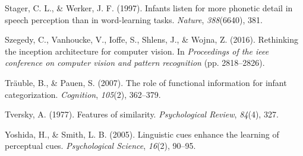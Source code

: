 \documentclass[10pt, letterpaper]{article}
\begin{document}
\hypertarget{ref-stager1997infants}{}
Stager, C. L., \& Werker, J. F. (1997). Infants listen for more phonetic
detail in speech perception than in word-learning tasks. \emph{Nature},
\emph{388}(6640), 381.

\hypertarget{ref-szegedy2016rethinking}{}
Szegedy, C., Vanhoucke, V., Ioffe, S., Shlens, J., \& Wojna, Z. (2016).
Rethinking the inception architecture for computer vision. In
\emph{Proceedings of the ieee conference on computer vision and pattern
recognition} (pp. 2818--2826).

\hypertarget{ref-trauble2007role}{}
Träuble, B., \& Pauen, S. (2007). The role of functional information for
infant categorization. \emph{Cognition}, \emph{105}(2), 362--379.

\hypertarget{ref-tversky1977features}{}
Tversky, A. (1977). Features of similarity. \emph{Psychological Review},
\emph{84}(4), 327.

\hypertarget{ref-yoshida2005linguistic}{}
Yoshida, H., \& Smith, L. B. (2005). Linguistic cues enhance the
learning of perceptual cues. \emph{Psychological Science}, \emph{16}(2),
90--95.
\end{document}
